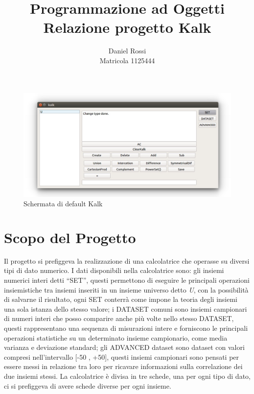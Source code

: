 \documentclass[a4paper,10pt]{article}
\begin{document}
        
        \title{Programmazione ad Oggetti\\Relazione progetto Kalk}
        \author{Daniel Rossi\\Matricola 1125444}
        \date{}
        \maketitle
        \begin{figure}[!h]
            \includegraphics[scale=0.5]{img/kalk.jpg}
                \caption{Schermata di default Kalk}
        \end{figure}
        \newpage
        \tableofcontents
        \newpage
        
        \section{Scopo del Progetto}
        Il progetto si prefiggeva la realizzazione di una calcolatrice che operasse su diversi tipi di dato numerico. I dati disponibili nella calcolatrice sono: gli insiemi numerici interi detti “SET”, questi permettono di eseguire le principali operazioni insiemistiche tra insiemi inseriti in un insieme universo detto \textit{U}, con la possibilità di salvarne il risultato, ogni SET conterrà come impone la teoria degli insiemi una sola istanza dello stesso valore; i DATASET comuni sono insiemi campionari di numeri interi che posso comparire anche più volte nello stesso DATASET, questi rappresentano una sequenza di misurazioni intere e forniscono le principali operazioni statistiche su un determinato insieme campionario, come media varianza e deviazione standard; gli ADVANCED dataset sono dataset con valori compresi nell’intervallo [-50 , +50], questi insiemi campionari sono pensati per essere messi in relazione tra loro per ricavare informazioni sulla correlazione dei due insiemi stessi. La calcolatrice è divisa in tre schede, una per ogni tipo di dato, ci si prefiggeva di avere schede diverse per ogni insieme.
    
\end{document}
